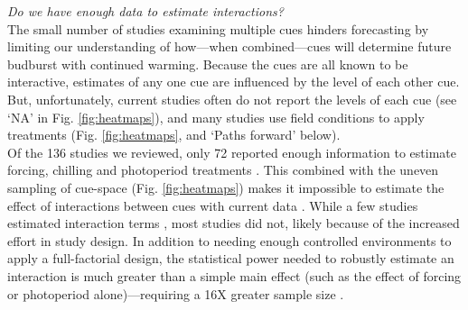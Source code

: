 \documentclass[11pt,letter]{article}
\begin{document}

\emph{Do we have enough data to estimate interactions?}\\
The small number of studies examining multiple cues hinders forecasting by limiting our understanding of how---when combined---cues will determine future budburst with continued warming. Because the cues are all known to be interactive, estimates of any one cue are influenced by the level of each other cue. But, unfortunately, current studies often do not report the levels of each cue (see `NA' in Fig. \ref{fig:heatmaps}), and many studies use field conditions to apply treatments (Fig. \ref{fig:heatmaps}, and `Paths forward' below).\\

Of the 136 studies we reviewed, only 72 reported enough information to estimate forcing, chilling and photoperiod treatments \citep{ettinger2020}. This combined with the uneven sampling of cue-space (Fig. \ref{fig:heatmaps}) makes it impossible to estimate the effect of interactions between cues with current data \citep{ettinger2020}. While a few studies estimated interaction terms \citep[e.g.,][]{zohner2014}, most studies did not, likely because of the increased effort in study design. In addition to needing enough controlled environments to apply a full-factorial design, the statistical power needed to robustly estimate an interaction is much greater than a simple main effect (such as the effect of forcing or photoperiod alone)---requiring a 16X greater sample size \citep{regotherstories}.\\ 
\end{document}
